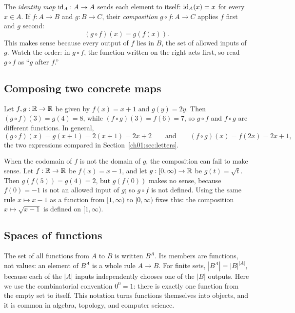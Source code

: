 The \emph{identity map} $\operatorname{id}_A:A\to A$ sends each element to itself: $\operatorname{id}_A(x)=x$ for every $x\in A$. If $f:A\to B$ and $g:B\to C$, their \emph{composition} $g\circ f:A\to C$ applies $f$ first and $g$ second:
\[
(g\circ f)(x)=g(f(x)).
\]
This makes sense because every output of $f$ lies in $B$, the set of allowed inputs of $g$. Watch the order: in $g\circ f$, the function written on the right acts first, so read $g\circ f$ as ``$g$ after $f$.''

\begin{center}
\end{center}

\subsection*{Composing two concrete maps}
Let $f,g:\mathbb R\to\mathbb R$ be given by $f(x)=x+1$ and $g(y)=2y$. Then $(g\circ f)(3)=g(4)=8$, while $(f\circ g)(3)=f(6)=7$, so $g\circ f$ and $f\circ g$ are different functions. In general,
\[
(g\circ f)(x)=g(x+1)=2(x+1)=2x+2\qquad\text{and}\qquad(f\circ g)(x)=f(2x)=2x+1,
\]
the two expressions compared in Section~\ref{ch01:sec:letters}.

When the codomain of $f$ is not the domain of $g$, the composition can fail to make sense. Let $f:\mathbb R\to\mathbb R$ be $f(x)=x-1$, and let $g:[0,\infty)\to\mathbb R$ be $g(t)=\sqrt t$. Then $g(f(5))=g(4)=2$, but $g(f(0))$ makes no sense, because $f(0)=-1$ is not an allowed input of $g$; so $g\circ f$ is not defined. Using the same rule $x\mapsto x-1$ as a function from $[1,\infty)$ to $[0,\infty)$ fixes this: the composition $x\mapsto\sqrt{x-1}$ is defined on $[1,\infty)$.

\subsection*{Spaces of functions}
The set of all functions from $A$ to $B$ is written $B^A$. Its members are functions, not values: an element of $B^A$ is a whole rule $A\to B$. For finite sets, $|B^A|=|B|^{|A|}$, because each of the $|A|$ inputs independently chooses one of the $|B|$ outputs. Here we use the combinatorial convention $0^0=1$: there is exactly one function from the empty set to itself. This notation turns functions themselves into objects, and it is common in algebra, topology, and computer science.

